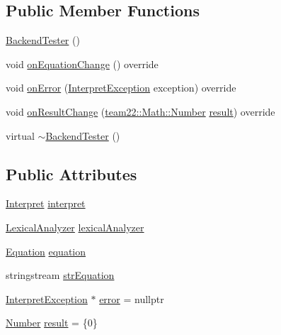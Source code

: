 \subsection*{Public Member Functions}
\begin{DoxyCompactItemize}
\item 
\hyperlink{class_backend_tester_ad3927c00c9026acabc91277dce2b9980}{Backend\+Tester} ()
\item 
void \hyperlink{class_backend_tester_a9b7caf17f8ad274936fab5ca4bc669f8}{on\+Equation\+Change} () override
\item 
void \hyperlink{class_backend_tester_a9f83f432f7d71304026ff07caf20a65d}{on\+Error} (\hyperlink{class_interpret_exception}{Interpret\+Exception} exception) override
\item 
void \hyperlink{class_backend_tester_af84da1816cef621e57c65a01aa26d66e}{on\+Result\+Change} (\hyperlink{classteam22_1_1_math_1_1_number}{team22\+::\+Math\+::\+Number} \hyperlink{class_backend_tester_a4c0eeb2e7a5f1ef876b6e61fdb1701fc}{result}) override
\item 
virtual \hyperlink{class_backend_tester_a02c1da72606e5b3683b642564af9611d}{$\sim$\+Backend\+Tester} ()
\end{DoxyCompactItemize}
\subsection*{Public Attributes}
\begin{DoxyCompactItemize}
\item 
\hyperlink{classteam22_1_1_calc_1_1_interpret}{Interpret} \hyperlink{class_backend_tester_ae033438ca3f49eeb6f1f8932fd17b717}{interpret}
\item 
\hyperlink{classteam22_1_1_calc_1_1_lexical_analyzer}{Lexical\+Analyzer} \hyperlink{class_backend_tester_a7dd738e95d26936889aefa439540698d}{lexical\+Analyzer}
\item 
\hyperlink{classteam22_1_1_calc_1_1_equation}{Equation} \hyperlink{class_backend_tester_a72e182a9a678f3c9dc6daf2bb8afb711}{equation}
\item 
stringstream \hyperlink{class_backend_tester_ac42c696a31021852c1868c2e45f1d8b1}{str\+Equation}
\item 
\hyperlink{class_interpret_exception}{Interpret\+Exception} $\ast$ \hyperlink{class_backend_tester_a8b8308a2c21881f287a49951792b2e0d}{error} = nullptr
\item 
\hyperlink{classteam22_1_1_math_1_1_number}{Number} \hyperlink{class_backend_tester_a4c0eeb2e7a5f1ef876b6e61fdb1701fc}{result} = \{0\}
\end{DoxyCompactItemize}
